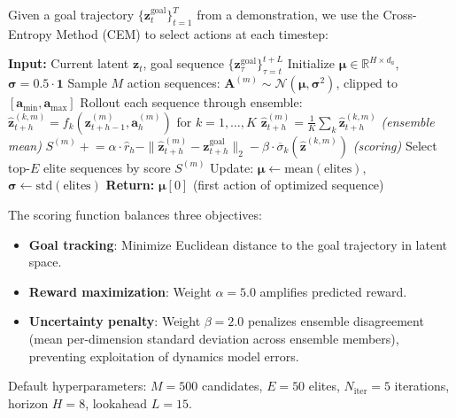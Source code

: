 \documentclass{article}
\begin{document}
Given a goal trajectory $\{\mathbf{z}_t^{\text{goal}}\}_{t=1}^{T}$ from a demonstration, we use the Cross-Entropy Method (CEM) to select actions at each timestep:

\begin{algorithm}[h]
\caption{CEM Planning Step}
\begin{algorithmic}[1]
\STATE \textbf{Input:} Current latent $\mathbf{z}_t$, goal sequence $\{\mathbf{z}_\tau^{\text{goal}}\}_{\tau=t}^{t+L}$
\STATE Initialize $\boldsymbol{\mu} \in \mathbb{R}^{H \times d_a}$, $\boldsymbol{\sigma} = 0.5 \cdot \mathbf{1}$
    \STATE Sample $M$ action sequences: $\mathbf{A}^{(m)} \sim \mathcal{N}(\boldsymbol{\mu}, \boldsymbol{\sigma}^2)$, clipped to $[\mathbf{a}_{\min}, \mathbf{a}_{\max}]$
    \STATE Rollout each sequence through ensemble:
        \STATE $\hat{\mathbf{z}}_{t+h}^{(k,m)} = f_k(\mathbf{z}_{t+h-1}^{(m)}, \mathbf{a}_h^{(m)})$ for $k = 1, \ldots, K$
        \STATE $\hat{\mathbf{z}}_{t+h}^{(m)} = \frac{1}{K} \sum_k \hat{\mathbf{z}}_{t+h}^{(k,m)}$ \hfill \textit{(ensemble mean)}
        \STATE $S^{(m)} \mathrel{+}= \alpha \cdot \hat{r}_h - \|\hat{\mathbf{z}}_{t+h}^{(m)} - \mathbf{z}_{t+h}^{\text{goal}}\|_2 - \beta \cdot \overline{\sigma}_k(\hat{\mathbf{z}}^{(k,m)})$ \hfill \textit{(scoring)}
    \ENDFOR
    \STATE Select top-$E$ elite sequences by score $S^{(m)}$
    \STATE Update: $\boldsymbol{\mu} \leftarrow \text{mean}(\text{elites})$, $\boldsymbol{\sigma} \leftarrow \text{std}(\text{elites})$
\ENDFOR
\STATE \textbf{Return:} $\boldsymbol{\mu}[0]$ (first action of optimized sequence)
\end{algorithmic}
\end{algorithm}

The scoring function balances three objectives:
\begin{itemize}
    \item \textbf{Goal tracking}: Minimize Euclidean distance to the goal trajectory in latent space.
    \item \textbf{Reward maximization}: Weight $\alpha = 5.0$ amplifies predicted reward.
    \item \textbf{Uncertainty penalty}: Weight $\beta = 2.0$ penalizes ensemble disagreement (mean per-dimension standard deviation across ensemble members), preventing exploitation of dynamics model errors.
\end{itemize}

Default hyperparameters: $M=500$ candidates, $E=50$ elites, $N_{\text{iter}}=5$ iterations, horizon $H=8$, lookahead $L=15$.
\end{document}
